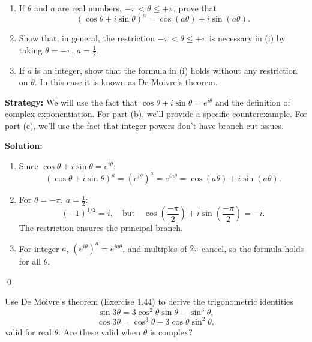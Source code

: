 \begin{problembox}
\begin{problemstatement}
\begin{enumerate}[label=\roman*)]
\item If \( \theta \) and \( a \) are real numbers, \( -\pi < \theta \leq +\pi \), prove that
\[
(\cos \theta + i \sin \theta)^a = \cos(a\theta) + i \sin(a\theta).
\]
\item Show that, in general, the restriction \( -\pi < \theta \leq +\pi \) is necessary in (i) by taking \( \theta = -\pi \), \( a = \tfrac{1}{2} \).
\item If \( a \) is an integer, show that the formula in (i) holds without any restriction on \( \theta \). In this case it is known as De Moivre's theorem.
\end{enumerate}
\end{problemstatement}
\end{problembox}

\noindent\textbf{Strategy:} We will use the fact that $\cos \theta + i \sin \theta = e^{i\theta}$ and the definition of complex exponentiation. For part (b), we'll provide a specific counterexample. For part (c), we'll use the fact that integer powers don't have branch cut issues.

\bigskip\noindent\textbf{Solution:}
\begin{enumerate}[label=\roman*)]
\item Since \( \cos \theta + i \sin \theta = e^{i\theta} \):
\[
(\cos \theta + i \sin \theta)^a = (e^{i\theta})^a = e^{i a \theta} = \cos(a\theta) + i \sin(a\theta).
\]
\item For \( \theta = -\pi \), \( a = \frac{1}{2} \):
\[
(-1)^{1/2} = i, \quad \text{but} \quad \cos\left(\frac{-\pi}{2}\right) + i \sin\left(\frac{-\pi}{2}\right) = -i.
\]
The restriction ensures the principal branch.
\item For integer \( a \), \( (e^{i\theta})^a = e^{i a \theta} \), and multiples of \( 2\pi \) cancel, so the formula holds for all \( \theta \).
\end{enumerate}\qed


\begin{problembox}
\begin{problemstatement}
Use De Moivre's theorem (Exercise 1.44) to derive the trigonometric identities
\[
\sin 3\theta = 3 \cos^2 \theta \sin \theta - \sin^3 \theta,
\]
\[
\cos 3\theta = \cos^3 \theta - 3 \cos \theta \sin^2 \theta,
\]
valid for real \( \theta \). Are these valid when \( \theta \) is complex?
\end{problemstatement}
\end{problembox}


